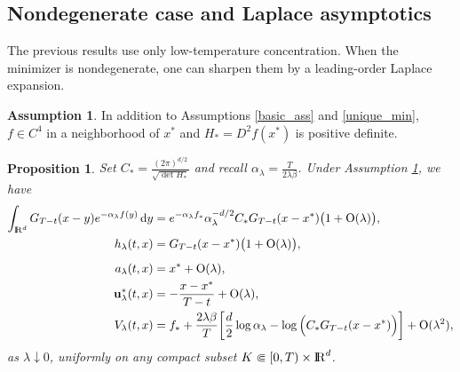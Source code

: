 \documentclass[11pt]{amsart}
\def\R{\mathrm{I\kern-0.21emR}}
\newcommand{\dd}{\,\mathrm{d}}
\numberwithin{equation}{section}
\numberwithin{figure}{section}
\newtheorem{proposition}[theorem]{Proposition}%
\theoremstyle{definition}\newtheorem{remark}[theorem]{Remark}%
\newtheorem{assumption}[theorem]{Assumption}
\begin{document}
\subsection{Nondegenerate case and Laplace asymptotics}

The previous results use only low-temperature concentration. When the minimizer is nondegenerate, one can sharpen them by a leading-order Laplace expansion.

\begin{assumption}\label{nondegenerate_ass}
In addition to Assumptions \ref{basic_ass} and \ref{unique_min}, $f \in C^4$ in a neighborhood of $x^*$ and $H_* = D^2 f(x^*)$ is positive definite.
\end{assumption}

\begin{proposition}\label{laplace_prop}
Set $\displaystyle C_* = \frac{(2\pi)^{d/2}}{\sqrt{\det H_*}}$ and recall 
 $\displaystyle\alpha_\lambda = \frac{T}{2\lambda\beta}$.
Under Assumption \ref{nondegenerate_ass}, we have
\begin{align}
\displaystyle \int_{\R^d} G_{T-t}(x-y)e^{-\alpha_\lambda f(y)}\dd y
&=
 \displaystyle e^{-\alpha_\lambda f_*}\alpha_\lambda^{-d/2} C_* G_{T-t}(x-x^*)\big( 1 + \mathrm{O}(\lambda) \big), \label{laplace_integral} \\
\displaystyle h_\lambda(t,x)
&=
 \displaystyle G_{T-t}(x-x^*)\big( 1 + \mathrm{O}(\lambda) \big), \label{laplace_h} \\[2mm]
\displaystyle a_\lambda(t,x)
&=
 \displaystyle x^* + \mathrm{O}(\lambda), \label{laplace_a} \\
\displaystyle \mathbf u_\lambda^*(t,x)
&=
\displaystyle - \frac{x - x^*}{T-t} + \mathrm{O}(\lambda), \label{laplace_u} \\
\displaystyle V_\lambda(t,x)
&=
\displaystyle f_* + \frac{2\lambda\beta}{T}\bigg[ \frac{d}{2}\log \alpha_\lambda - \log \Big( C_* G_{T-t}(x-x^*) \Big) \bigg] + \mathrm{O}(\lambda^2), \label{laplace_V}
\end{align}
as $\lambda \downarrow 0$, uniformly on any compact subset $K \Subset [0,T) \times \R^d$.
\end{proposition}
\end{document}
